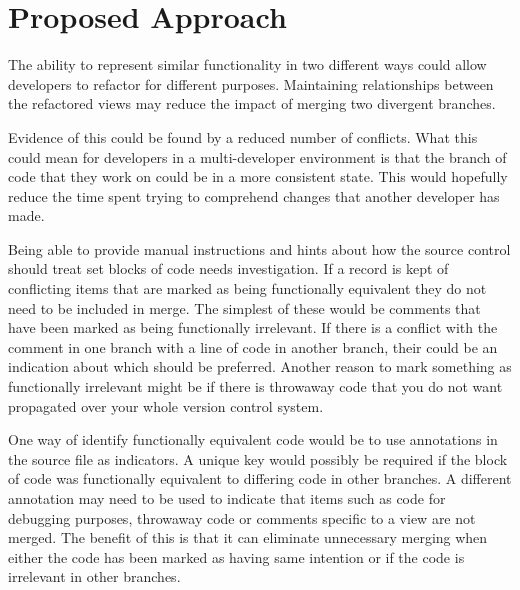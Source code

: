 \documentclass[12pt]{CRPITStyle}
\begin{document}
\section{Proposed Approach}
The ability to represent similar functionality in two different ways could allow developers to refactor for different purposes. Maintaining relationships between the refactored views may reduce the impact of merging two divergent branches. 


Evidence of this could be found by a reduced number of conflicts. What this could mean for developers in a multi-developer environment is that the branch of code that they work on could be in a more consistent state. This would hopefully reduce the time spent trying to comprehend changes that another developer has made.

Being able to provide manual instructions and hints about how the source control should treat set blocks of code needs investigation. If a record is kept of conflicting items that are marked as being functionally equivalent they do not need to be included in merge. The simplest of these would be comments that have been marked as being functionally irrelevant. If there is a conflict with the comment in one branch with a line of code in another branch, their could be an indication about which should be preferred. Another reason to mark something as functionally irrelevant might be if there is throwaway code that you do not want propagated over your whole version control system.

One way of identify functionally equivalent code would be to use annotations in the source file as indicators. A unique key would possibly be required if the block of code was functionally equivalent to differing code in other branches. A different annotation may need to be used to indicate that items such as code for debugging purposes, throwaway code or comments specific to a view are not merged. The benefit of this is that it can eliminate unnecessary merging when either the code has been marked as having same intention or if the code is irrelevant in other branches.
\end{document}
